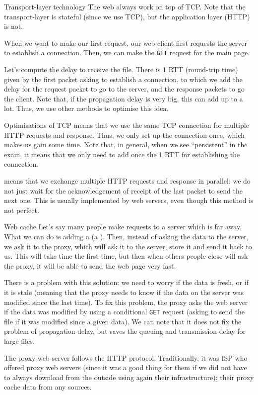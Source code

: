 \documentclass[a4paper]{article}
\begin{document}
\begin{parag}{Transport-layer technology}
    The web always work on top of TCP. Note that the transport-layer is stateful (since we use TCP), but the application layer (HTTP) is not.

    When we want to make our first request, our web client first requests the server to establish a connection. Then, we can make the \texttt{GET} request for the main page.

    Let's compute the delay to receive the file. There is 1 RTT (round-trip time) given by the first packet asking to establish a connection, to which we add the delay for the request packet to go to the server, and the response packets to go the client. Note that, if the propagation delay is very big, this can add up to a lot. Thus, we use other methods to optimise this idea.

    \begin{subparag}{Optimisations of TCP}
         means that we use the same TCP connection for multiple HTTP requests and response. Thus, we only set up the connection once, which makes us gain some time. Note that, in general, when we see ``persistent'' in the exam, it means that we only need to add once the 1 RTT for establishing the connection. 

         means that we exchange multiple HTTP requests and response in parallel: we do not just wait for the acknowledgement of receipt of the last packet to send the next one. This is usually implemented by web servers, even though this method is not perfect.
    \end{subparag}

    \begin{subparag}{Web cache}
        Let's say many people make requests to a server which is far away. What we can do is adding a  (a ). Then, instead of asking the data to the server, we ask it to the proxy, which will ask it to the server, store it and send it back to us. This will take time the first time, but then when others people close will ask the proxy, it will be able to send the web page very fast.

        There is a problem with this solution: we need to worry if the data is fresh, or if it is stale (meaning that the proxy needs to know if the data on the server was modified since the last time). To fix this problem, the proxy asks the web server if the data was modified by using a conditional \texttt{GET} request (asking to send the file if it was modified since a given data). We can note that it does not fix the problem of propagation delay, but saves the queuing and transmission delay for large files.

        The proxy web server follows the HTTP protocol. Traditionally, it was ISP who offered proxy web servers (since it was a good thing for them if we did not have to always download from the outside using again their infrastructure); their proxy cache data from any sources.
    \end{subparag}
    
\end{parag}
    
\end{document}
